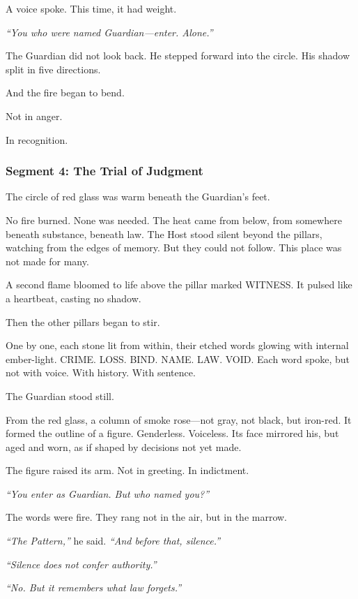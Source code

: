\documentclass[9pt]{article}
\begin{document}
A voice spoke. This time, it had weight.

\textit{``You who were named Guardian—enter. Alone.''}

The Guardian did not look back. He stepped forward into the circle. His shadow split in five directions.

And the fire began to bend.

Not in anger.

In recognition.

\newpage

\subsubsection*{Segment 4: The Trial of Judgment}

The circle of red glass was warm beneath the Guardian’s feet.

No fire burned. None was needed. The heat came from below, from somewhere beneath substance, beneath law. The Host stood silent beyond the pillars, watching from the edges of memory. But they could not follow. This place was not made for many.

A second flame bloomed to life above the pillar marked \textsc{WITNESS}. It pulsed like a heartbeat, casting no shadow.

Then the other pillars began to stir.

One by one, each stone lit from within, their etched words glowing with internal ember-light. \textsc{CRIME}. \textsc{LOSS}. \textsc{BIND}. \textsc{NAME}. \textsc{LAW}. \textsc{VOID}. Each word spoke, but not with voice. With history. With sentence.

The Guardian stood still.

From the red glass, a column of smoke rose—not gray, not black, but iron-red. It formed the outline of a figure. Genderless. Voiceless. Its face mirrored his, but aged and worn, as if shaped by decisions not yet made.

The figure raised its arm. Not in greeting. In indictment.

\textit{``You enter as Guardian. But who named you?''}

The words were fire. They rang not in the air, but in the marrow.

\textit{``The Pattern,''} he said. \textit{``And before that, silence.''}

\textit{``Silence does not confer authority.''}

\textit{``No. But it remembers what law forgets.''}
\end{document}
